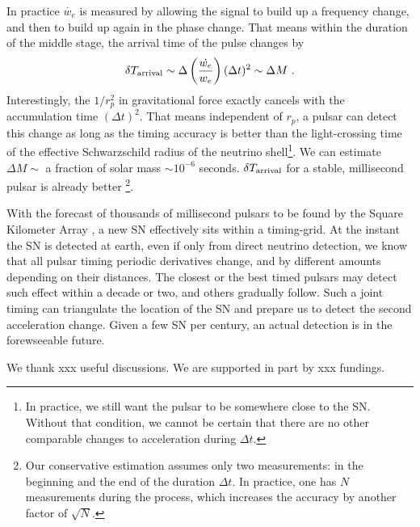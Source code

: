 \documentclass[aps,showpacs,twocolumn,floats,prd,superscriptaddress,nofootinbib]{revtex4-1}
\begin{document}
In practice $\dot{w_e}$ is measured by allowing the signal to build up a frequency change, and then to build up again in the phase change. That means within the duration of the middle stage, the arrival time of the pulse changes by 
\begin{equation}
\delta T_{\rm arrival} \sim \Delta\left(\frac{\dot{w_e}}{w_e}\right)(\Delta t)^2
\sim \Delta M~.
\end{equation}
Interestingly, the $1/r_p^2$ in gravitational force exactly cancels with the accumulation time $(\Delta t)^2$. That means independent of $r_p$, a pulsar can detect this change as long as the timing accuracy is better than the light-crossing time of the effective Schwarzschild radius of the neutrino shell\footnote{In practice, we still want the pulsar to be somewhere close to the SN. Without that condition, we cannot be certain that there are no other comparable changes to acceleration during $\Delta t$.}. We can estimate $\Delta M\sim$ a fraction of solar mass $\sim10^{-6}$ seconds. $\delta T_{\rm arrival}$ for a stable, millisecond pulsar is already better \cite{PulsarTiming}\footnote{Our conservative estimation assumes only two measurements: in the beginning and the end of the duration $\Delta t$. In practice, one has $N$ measurements during the process, which increases the accuracy by another factor of $\sqrt{N}$.}.

With the forecast of thousands of millisecond pulsars to be found by the Square Kilometer Array \cite{SKA}, a new SN effectively sits within a timing-grid. At the instant the SN is detected at earth, even if only from direct neutrino detection, we know that all pulsar timing periodic derivatives change, and by different amounts depending on their distances. The closest or the best timed pulsars may detect such effect within a decade or two, and others gradually follow. Such a joint timing can triangulate the location of the SN and prepare us to detect the second acceleration change. Given a few SN per century\cite{SNrate06}, an actual detection is in the forewseeable future.


\acknowledgments

We thank xxx useful discussions. We are supported in part by xxx fundings.

\appendix

%

\end{document}
